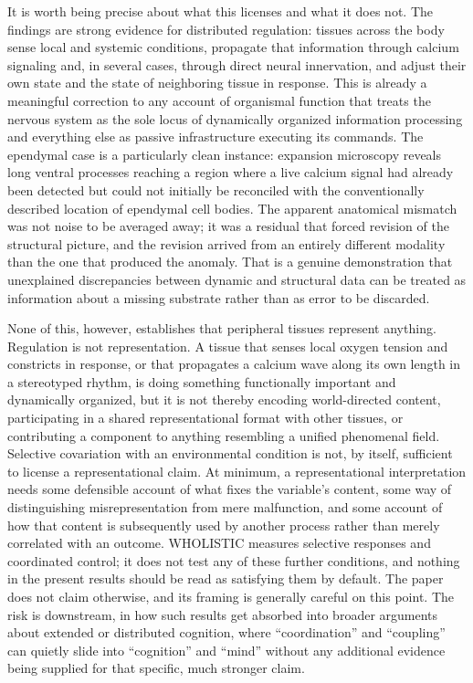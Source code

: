 \documentclass[11pt]{article}
\begin{document}
It is worth being precise about what this licenses and what it does not. The findings are strong evidence for distributed regulation: tissues across the body sense local and systemic conditions, propagate that information through calcium signaling and, in several cases, through direct neural innervation, and adjust their own state and the state of neighboring tissue in response. This is already a meaningful correction to any account of organismal function that treats the nervous system as the sole locus of dynamically organized information processing and everything else as passive infrastructure executing its commands. The ependymal case is a particularly clean instance: expansion microscopy reveals long ventral processes reaching a region where a live calcium signal had already been detected but could not initially be reconciled with the conventionally described location of ependymal cell bodies. The apparent anatomical mismatch was not noise to be averaged away; it was a residual that forced revision of the structural picture, and the revision arrived from an entirely different modality than the one that produced the anomaly. That is a genuine demonstration that unexplained discrepancies between dynamic and structural data can be treated as information about a missing substrate rather than as error to be discarded.

None of this, however, establishes that peripheral tissues represent anything. Regulation is not representation. A tissue that senses local oxygen tension and constricts in response, or that propagates a calcium wave along its own length in a stereotyped rhythm, is doing something functionally important and dynamically organized, but it is not thereby encoding world-directed content, participating in a shared representational format with other tissues, or contributing a component to anything resembling a unified phenomenal field. Selective covariation with an environmental condition is not, by itself, sufficient to license a representational claim. At minimum, a representational interpretation needs some defensible account of what fixes the variable's content, some way of distinguishing misrepresentation from mere malfunction, and some account of how that content is subsequently used by another process rather than merely correlated with an outcome. WHOLISTIC measures selective responses and coordinated control; it does not test any of these further conditions, and nothing in the present results should be read as satisfying them by default. The paper does not claim otherwise, and its framing is generally careful on this point. The risk is downstream, in how such results get absorbed into broader arguments about extended or distributed cognition, where ``coordination'' and ``coupling'' can quietly slide into ``cognition'' and ``mind'' without any additional evidence being supplied for that specific, much stronger claim.
\end{document}
